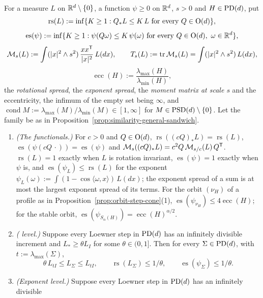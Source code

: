 \begin{proposition}\label{prop:similarity-general-bounded-shape}
For a measure $L$ on $\mathbb{R}^d \setminus \{0\}$, a function $\psi \ge 0$ on $\mathbb{R}^d$, $s > 0$ and
$H \in \mathrm{PD}(d)$, put
\[
  \operatorname{rs}(L) := \inf\{K \ge 1 : Q_*L \le K\,L \text{ for every } Q \in \mathrm{O}(d)\},
\]
\[
  \operatorname{es}(\psi) := \inf\{K \ge 1 : \psi(Q\omega) \le K\,\psi(\omega) \text{ for every } Q \in \Orth(d),\ \omega \in \RR^d\},
\]
\[
  \mathcal M_s(L) := \int(|x|^2 \wedge s^2)\,\frac{xx^{\mathsf{T}}}{|x|^2}\,L(dx),
  \qquad T_s(L) := \operatorname{tr}\mathcal M_s(L) = \int(|x|^2 \wedge s^2)\,L(dx),
\]
\[
  \operatorname{ecc}(H) := \frac{\lambda_{\max}(H)}{\lambda_{\min}(H)} ,
\]
the \emph{rotational spread}, the \emph{exponent spread}, the \emph{moment matrix at scale $s$} and
the eccentricity, the infimum of the empty set being $\infty$, and $\operatorname{cond}M := \lambda_{\max}(M)/\lambda_{\min}(M)
\in [1,\infty]$ for $M \in \mathrm{PSD}(d) \setminus \{0\}$. Let the family be as in
Proposition~\ref{prop:similarity-general-sandwich}.
\begin{enumerate}
\item \emph{(The functionals.)} For $c > 0$ and $Q \in \mathrm{O}(d)$,
$\operatorname{rs}((cQ)_*L) = \operatorname{rs}(L)$, $\operatorname{es}(\psi(cQ\,\cdot)) = \operatorname{es}(\psi)$
and $\mathcal M_s((cQ)_*L) = c^2Q\,\mathcal M_{s/c}(L)\,Q^{\mathsf{T}}$. $\operatorname{rs}(L) = 1$ exactly when $L$ is rotation
invariant, $\operatorname{es}(\psi) = 1$ exactly when $\psi$ is, and $\operatorname{es}(\psi_L) \le \operatorname{rs}(L)$ for the
exponent $\psi_L(\omega) := \int(1 - \cos\langle\omega,x\rangle)\,L(dx)$; the exponent spread of a sum is at
most the largest exponent spread of its terms. For the orbit $(\nu_H)$ of a profile as in
Proposition~\ref{prop:orbit-step-cone}(1), $\operatorname{es}(\psi_{\nu_H}) \le 4\operatorname{ecc}(H)$; for the stable orbit,
$\operatorname{es}(\psi_{S_\alpha(H)}) = \operatorname{ecc}(H)^{\alpha/2}$.
\item \emph{(\Levy{} level.)} Suppose every Loewner step in $\mathrm{PD}(d)$ has an infinitely divisible
increment and $L_* \ge \theta L_I$ for some $\theta \in (0,1]$. Then for every $\Sigma \in \mathrm{PD}(d)$, with
$t := \lambda_{\max}(\Sigma)$,
\[
  \theta\,L_{tI} \le L_\Sigma \le L_{tI} ,
  \qquad
  \operatorname{rs}(L_\Sigma) \le 1/\theta ,
  \qquad
  \operatorname{es}(\psi_\Sigma) \le 1/\theta .
\]
\item \emph{(Exponent level.)} Suppose every Loewner step in $\mathrm{PD}(d)$ has an infinitely divisible

\end{enumerate}
\end{proposition}
